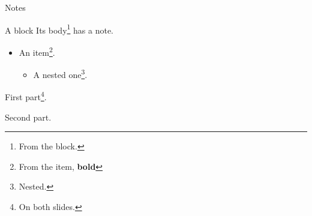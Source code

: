 \documentclass{beamer}
\begin{document}
\begin{frame}{Notes}
\begin{block}{A block}
Its body\footnote{From the block.} has a note.
\end{block}
\begin{itemize}
\item An item\footnote{ From the item, \textbf{bold} }.
\begin{itemize}
\item A nested one\footnote{Nested.}.
\end{itemize}
\end{itemize}
\end{frame}
\begin{frame}
First part\footnote{On both slides.}.

\pause

Second part.
\end{frame}
\end{document}
